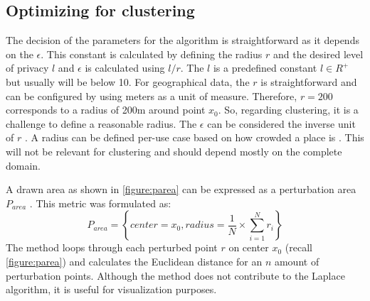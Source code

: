 \subsection{Optimizing for clustering}
The decision of the parameters for the algorithm is straightforward as it depends on the $\epsilon$.
This constant is calculated by defining the radius $r$ and the desired level of privacy $l$ and $\epsilon$ is calculated using $l/r$.
The $l$ is a predefined constant $l \in R^+$ but usually will be below 10.
For geographical data, the $r$ is straightforward and can be configured by using meters as a unit of measure.
Therefore, $r = 200$ corresponds to a radius of 200m around point $x_0$.
So, regarding clustering, it is a challenge to define a reasonable radius. \newline
The $\epsilon$ can be considered the inverse unit of $r$ \cite{DBLP:journals/corr/abs-1212-1984}.
A radius can be defined per-use case based on how crowded a place is \citep{chatzikokolakis_constructing_2015}.
This will not be relevant for clustering and should depend mostly on the complete domain. \newline

A drawn area as shown in \ref{figure:parea} can be expressed as a perturbation area $P_{area}$ \citep{yan_perturb_2022-2}.
This metric was formulated as:
\begin{equation}
  P_{area}=\left\{ center = x_{0},radius = \frac{1}{N}\times \sum _{i=1}^{N}r_{i}\right\}
\end{equation}
The method loops through each perturbed point $r$ on center $x_0$ (recall \ref{figure:parea}) and calculates the Euclidean distance for an $n$ amount of perturbation points.
Although the method does not contribute to the Laplace algorithm, it is useful for visualization purposes.

